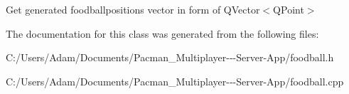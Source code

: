 Get generated foodballpositions vector in form of Q\+Vector$<$\+Q\+Point$>$ 

The documentation for this class was generated from the following files\+:\begin{DoxyCompactItemize}
\item 
C\+:/\+Users/\+Adam/\+Documents/\+Pacman\+\_\+\+Multiplayer-\/-\/-\/\+Server-\/\+App/foodball.\+h\item 
C\+:/\+Users/\+Adam/\+Documents/\+Pacman\+\_\+\+Multiplayer-\/-\/-\/\+Server-\/\+App/foodball.\+cpp\end{DoxyCompactItemize}
